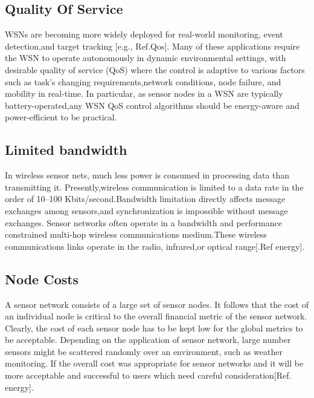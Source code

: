 	
	
	\subsection{Quality Of Service}
	WSNs are   becoming   more widely  deployed  for  real-world  monitoring, event detection,and target tracking  [e.g., \cite{}Ref.Qos]. Many of these applications require the  WSN  to  operate  autonomously in dynamic environmental settings, with desirable quality of service (QoS) where  the  control  is  adaptive  to  various  factors  such  as  task’s changing  requirements,network  conditions,  node  failure,  and mobility  in  real-time.  In  particular,  as  sensor  nodes  in  a WSN are typically battery-operated,any WSN QoS control  algorithms  should  be  energy-aware  and  power-efficient  to  be practical. 



	\subsection{Limited bandwidth}
	In   wireless   sensor   nets,   much   less   power   is consumed in processing data than transmitting it. Presently,wireless communication is limited to a data rate in the order of 10–100 Kbits/second.Bandwidth   limitation   directly   affects   message exchanges among sensors,and     synchronization is impossible  without  message  exchanges.  Sensor  networks often operate in a bandwidth and performance constrained multi-hop  wireless communications medium.These wireless communications links operate in the radio, infrared,or optical range[\cite{}.Ref energy].   
	
	\subsection{Node Costs}
	A  sensor  network  consists  of  a  large  set  of  sensor nodes.  It  follows  that  the  cost  of  an  individual  node  is critical to the overall financial metric of the sensor network. Clearly, the cost of each sensor node has to be kept low for the global metrics  to  be acceptable.  Depending  on  the application  of  sensor  network,  large  number  sensors  might be scattered randomly over an environment, such as weather monitoring.  If  the  overall  cost  was  appropriate  for  sensor networks  and  it  will be more acceptable and successful to users which need careful consideration[\cite{}Ref. energy]. 
	

